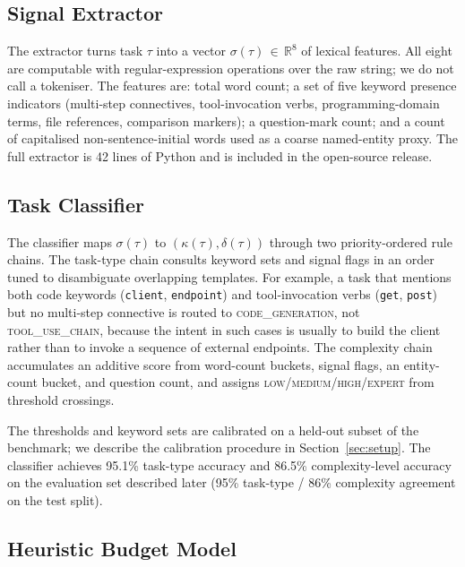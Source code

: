 \documentclass{article}
\newcommand{\code}[1]{\texttt{\small #1}}
\begin{document}
\subsection{Signal Extractor}
\label{sec:extractor}

The extractor turns task $\tau$ into a vector
$\sigma(\tau)\,{\in}\,\mathbb{R}^{8}$ of lexical features. All eight are
computable with regular-expression operations over the raw string; we do
not call a tokeniser. The features are: total word count; a set of five
keyword presence indicators (multi-step connectives, tool-invocation
verbs, programming-domain terms, file references, comparison markers); a
question-mark count; and a count of capitalised non-sentence-initial
words used as a coarse named-entity proxy. The full extractor is 42
lines of Python and is included in the open-source release.

\subsection{Task Classifier}
\label{sec:classifier}

The classifier maps $\sigma(\tau)$ to $(\kappa(\tau), \delta(\tau))$
through two priority-ordered rule chains. The task-type chain consults
keyword sets and signal flags in an order tuned to disambiguate
overlapping templates. For example, a task that mentions both code
keywords (\code{client}, \code{endpoint}) and tool-invocation verbs
(\code{get}, \code{post}) but no multi-step connective is routed to
\textsc{code\_generation}, not \textsc{tool\_use\_chain}, because the
intent in such cases is usually to build the client rather than to
invoke a sequence of external endpoints. The complexity chain
accumulates an additive score from word-count buckets, signal flags, an
entity-count bucket, and question count, and assigns
\textsc{low}/\textsc{medium}/\textsc{high}/\textsc{expert} from
threshold crossings.

The thresholds and keyword sets are calibrated on a held-out subset of
the benchmark; we describe the calibration procedure in
Section~\ref{sec:setup}. The classifier achieves 95.1\% task-type
accuracy and 86.5\% complexity-level accuracy on the evaluation set
described later (95\% task-type / 86\% complexity agreement on the test split).

\subsection{Heuristic Budget Model}
\label{sec:budget}
\end{document}

